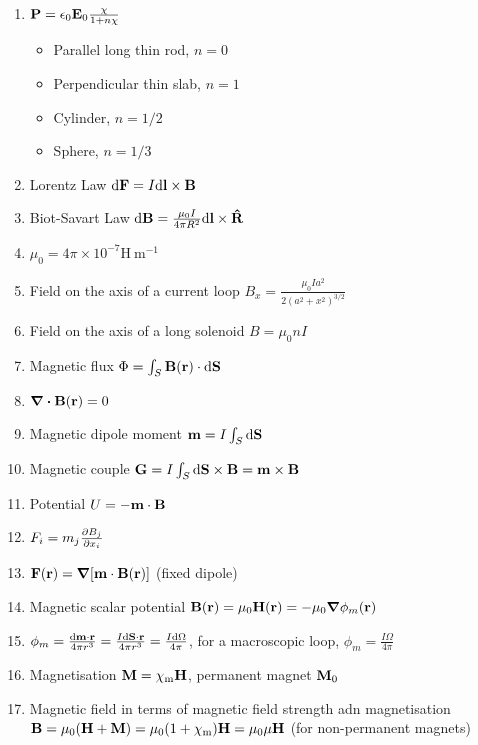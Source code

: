\documentclass{article}
\theoremstyle{remark}
\theoremstyle{remark}
\newcommand{\s}[1]{\textsubscript{#1}}
\begin{document}
\begin{enumerate}
\begin{itemize}
\begin{center}
            \end{center}
    \end{itemize}
    \item $\vb{P} = \epsilon_0\vb{E}_0\frac{\chi}{1+n\chi} $\begin{itemize}
        \item Parallel long thin rod, $n=0$
        \item Perpendicular thin slab, $n=1$
        \item Cylinder, $n=1/2$
        \item Sphere, $n=1/3$
    \end{itemize}
    \item Lorentz Law $\dd \vb{F}=I\dd\vb{l}\times\vb{B} $
    \item Biot-Savart Law $\dd\vb{B} = \frac{\mu_0 I}{4\pi R^2}\dd\vb{l}\times\vb{\hat R} $
    \item $\mu_0 = 4\pi\times10^{-7} \mathrm{H\ m^{-1}}$
    \item Field on the axis of a current loop $B_x = \frac{\mu_0 I a^2}{2(a^2+x^2)^{3/2}} $
    \item Field on the axis of a long solenoid $B = \mu_0 n I $
    \item Magnetic flux $\Phi = \int_S\vb{B}(\vb{r})\cdot\dd\vb{S} $
    \item $\div\vb{B}(\vb{r}) = 0 $
    \item Magnetic dipole moment $\vb{m} = I\int_S\dd\vb{S} $
    \item Magnetic couple $\vb{G} = I\int_S\dd\vb{S}\times\vb{B} = \vb{m}\times\vb{B} $
    \item Potential $U = -\vb{m}\cdot\vb{B} $
    \item $F_i = m_j\pdv{B_j}{x_i} $
    \item $\vb{F}(\vb{r}) = \grad[\vb{m}\cdot\vb{B}(\vb{r})] $ (fixed dipole)
    \item Magnetic scalar potential $\vb{B}(\vb{r}) = \mu_0\vb{H}(\vb{r}) = -\mu_0\grad\phi_m(\vb{r})$
    \item $\phi_m = \frac{\dd \vb{m}\cdot\vb{r}}{4\pi r^3} = \frac{I\dd\vb{S}\cdot\vb{r}}{4\pi r^3} = \frac{I\dd\Omega}{4\pi}$, for a macroscopic loop, $\phi_m=\frac{I\Omega}{4\pi}$
    \item Magnetisation $\vb{M}=\chi\s m \vb{H}$, permanent magnet $\vb{M}_0$
    \item Magnetic field in terms of magnetic field strength adn magnetisation $\vb{B}=\mu_0(\vb{H}+\vb{M}) = \mu_0(1+\chi\s m)\vb{H} = \mu_0\mu\vb{H}$ (for non-permanent magnets)

\end{enumerate}
\end{document}
